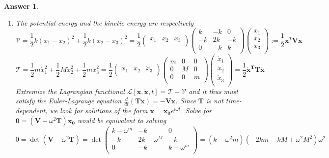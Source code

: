 \documentclass[a4paper]{article}
\newtheorem{ans}{Answer}[section]
\theoremstyle{new}
\begin{document}
\newpage
\begin{ans}\leavevmode
\begin{enumerate}[label=(\roman*)]
\item The potential energy and the kinetic energy are respectively
$$\mathcal{V}=\frac{1}{2}k(x_1-x_2)^2+\frac{1}{2}k(x_2-x_3)^2=\frac{1}{2}\begin{pmatrix}x_1&x_2&x_3\\\end{pmatrix}\begin{pmatrix}k&-k&0\\-k&2k&-k\\0&-k&k\\\end{pmatrix}\begin{pmatrix}x_1\\x_2\\x_3\\\end{pmatrix}:=\frac{1}{2}\mathbf{x}^T\mathbf{V}\mathbf{x}$$
$$\mathcal{T}=\frac{1}{2}m\dot{x}_1^2+\frac{1}{2}M\dot{x}_2^2+\frac{1}{2}m\dot{x}_3^2=\frac{1}{2}\begin{pmatrix}\dot{x}_1&\dot{x}_2&\dot{x}_3\\\end{pmatrix}\begin{pmatrix}m&0&0\\0&M&0\\0&0&m\\\end{pmatrix}\begin{pmatrix}\dot{x}_1\\\dot{x}_2\\\dot{x}_3\\\end{pmatrix}=\frac{1}{2}\mathbf{\dot{x}^TT\dot{x}}$$
Extremize the Lagrangian functional $\mathcal{L}[\mathbf{x},\mathbf{\dot{x}},t]=\mathcal{T}-\mathcal{V}$ and it thus must satisfy the Euler-Lagrange equation $\frac{d}{dt}(\mathbf{T\dot{x}})=-\mathbf{Vx}$. Since $\mathbf{T}$ is not time-dependent, we look for solutions of the form $\mathbf{x}=\mathbf{x_0}e^{i\omega t}$. Solve for $\boldsymbol{0}=(\mathbf{V}-\omega^2\mathbf{T})\mathbf{x_0}$ would be equivalent to solving $$0=\det(\mathbf{V}-\omega^2\mathbf{T})=\det\begin{pmatrix}k-\omega^m&-k&0\\-k&2k-\omega^M&-k\\0&-k&k-\omega^m\\\end{pmatrix}=(k-\omega^2m)(-2km-kM+\omega^2M^2)\omega^2$$

\end{enumerate}
\end{ans}
\end{document}
